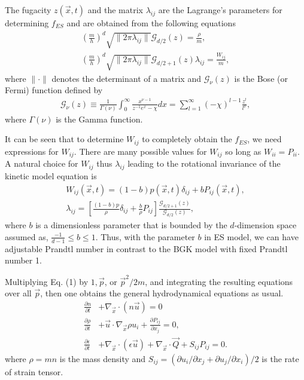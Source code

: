 \documentclass[aip,jmp,amsmath,amssymb,reprint,noshowpacs]{revtex4-1}
\begin{document}
The fugacity $z(\vec x,t)$ and the matrix $\lambda_{i j}$ are the Lagrange's parameters for determining $f_{ES}$ and are obtained from the following equations
\begin{align}
\left(\frac{m}{h}\right)^d \sqrt{ \|2 \pi \lambda_{i j}\| } \mathcal{G}_{d/2}(z) = \frac{\rho}{m}, \\
\left(\frac{m}{h}\right)^d \sqrt{ \|2 \pi \lambda_{i j}\| } \mathcal{G}_{d/2 +1}(z) \lambda_{i j} = \frac{W_{i j}}{m},
\end{align}
where $\| \cdot \|$ denotes the determinant of a matrix and $\mathcal{G}_{\nu}(z)$ is the Bose (or Fermi) function defined by
\begin{align}
\mathcal{G}_{\nu}(z) \equiv \frac{1}{\Gamma(\nu)} \int^{\infty}_0 \frac{ x^{\nu
-1} }{ {z^{-1} e^x - \chi}}dx = \sum^{\infty}_{l=1}
(-\chi)^{l-1} \frac{z^l}{l^{\nu}},
\end{align}
where $\Gamma(\nu)$ is the Gamma function.

It can be seen that to determine $W_{i j} $ to completely obtain the $f_{ES}$, we need expressions for $W_{i j}$.   There are many possible values for $W_{i j}$ so long as $W_{i i}=P_{i i}$.   A natural choice for $W_{ij}$ thus $\lambda_{i j}$ leading to the rotational invariance of the kinetic model equation is \cite{Holway1966}
\begin{align}
W_{i j}(\vec x, t) = (1 - b) p(\vec x, t) \delta_{i j} + b P_{i j}(\vec x, t), \\
\lambda_{i j} = \left[\frac{(1-b)p}{\rho} \delta_{i j}+ \frac{b}{\rho}P_{i j } \right] \frac{\mathcal{G}_{d/2+1}(z)}{\mathcal{G}_{d/2}(z)},
\end{align}
where $b$ is a dimensionless parameter that is bounded by the $d$-dimension space assumed as, $\frac{-1}{d-1} \le b \le 1$.  Thus, with the parameter $b$ in ES model, we can have adjustable Prandtl number in contrast to the BGK model with fixed Prandtl number 1.

Multiplying Eq. (1) by $1, \vec p$, or $\vec p^2/2m$, and integrating the resulting equations over all $\vec p$, then one obtains the general hydrodynamical equations as usual.
\begin{align}
\frac{\partial n}{\partial t} &+ \nabla_{\vec x} \cdot (n \vec u) = 0 \\
\frac{\partial \rho}{\partial t} &+ \vec u \cdot \nabla_{\vec x} \rho u_{i} + \frac{\partial P_{ij}}{\partial x_{j} } = 0, \\
\frac{\partial \epsilon}{\partial t} &+ \nabla_{\vec x} \cdot (\epsilon \vec u) + \nabla_{\vec x} \cdot \vec Q + S_{ij} P_{ij} = 0.
\end{align}
where $\rho=m n$ is the mass density and $S_{ij}=(\partial u_{i}/\partial x_{j} + \partial u_{j}/\partial x_{i})/2$ is the rate of strain tensor.
\end{document}

